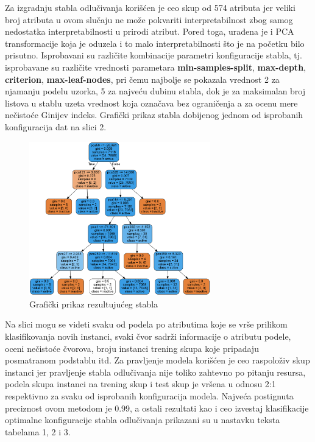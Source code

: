 \documentclass[12pt]{article}
\begin{document}
Za izgradnju stabla odlučivanja korišćen je ceo skup od 574 atributa jer veliki broj atributa u ovom slučaju ne može pokvariti interpretabilnost zbog samog nedostatka interpretabilnosti u prirodi atribut. Pored toga, urađena je i  PCA transformacije koja je oduzela i to malo interpretabilnosti što je na početku bilo prisutno. Isprobavani su različite kombinacije parametri konfiguracije stabla, tj. isprobavane su različite vrednosti parametara {\bf min-samples-split}, {\bf max-depth}, {\bf criterion}, {\bf max-leaf-nodes}, pri čemu najbolje se pokazala vrednost 2 za njamanju podelu uzorka, 5 za najveću dubinu stabla, dok je za maksimalan broj listova u stablu uzeta vrednost koja označava bez ograničenja a za ocenu mere nečistoće Ginijev indeks. Grafički prikaz stabla dobijenog jednom od isprobanih konfiguracija dat na slici 2.

\begin{figure}[h]
    \centering
    \includegraphics[width=0.7\textwidth]{img/tree.png}
    \caption{Grafički prikaz rezultujućeg stabla}
    \label{fig:mesh1}
\end{figure}

Na slici mogu se videti svaku od podela po atributima koje se vrše prilikom klasifikovanja novih instanci, svaki čvor sadrži informacije o atributu podele, oceni nečistoće čvorova, broju instanci trening skupa koje pripadaju posmatranom podstablu itd. Za pravljenje modela korišćen je ceo raspoloživ skup instanci jer pravljenje stabla odlučivanja nije toliko zahtevno po pitanju resursa, podela skupa instanci na trening skup i test skup je vršena u odnosu 2:1 respektivno za svaku od isprobanih konfiguracija modela. Najveća postignuta preciznost ovom metodom je 0.99, a ostali rezultati kao i ceo izvestaj klasifikacije optimalne konfiguracije stabla odlučivanja prikazani su u nastavku teksta tabelama 1, 2 i 3.  
\end{document}
